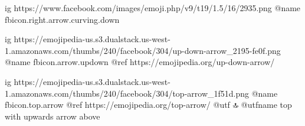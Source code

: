  
 
 
 
 

\ifcmt
	ig https://www.facebook.com/images/emoji.php/v9/t19/1.5/16/2935.png
	@name fbicon.right.arrow.curving.down

  ig https://emojipedia-us.s3.dualstack.us-west-1.amazonaws.com/thumbs/240/facebook/304/up-down-arrow_2195-fe0f.png
  @name fbicon.arrow.updown
  @ref https://emojipedia.org/up-down-arrow/

  ig https://emojipedia-us.s3.dualstack.us-west-1.amazonaws.com/thumbs/240/facebook/304/top-arrow_1f51d.png
  @name fbicon.top.arrow
  @ref https://emojipedia.org/top-arrow/
  @utf 🔝
  @utfname top with upwards arrow above
\fi
